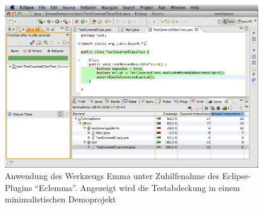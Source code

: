\newpage

\begin{figure}
\centering
\includegraphics[width=1\textwidth]{eclemma}
\caption{Anwendung des Werkzeugs Emma unter Zuhilfenahme des Eclipse-Plugins ``Eclemma''. Angezeigt wird die Testabdeckung in einem minimalistischen Demoprojekt}
\label{fig:pmd}
\end{figure}